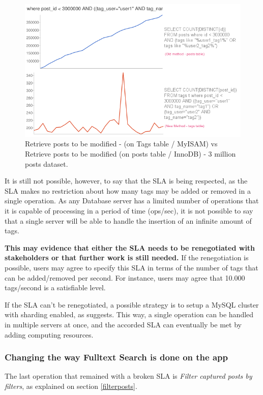 \begin{figure}[ht!]
\centering
\includegraphics[width=120mm]{Imagens/tagsVSposts.png}
\caption{Retrieve posts to be modified -  (on Tags table / MyISAM) vs Retrieve posts to be modified (on posts table / InnoDB) - 3 million posts dataset.\label{fig:tagsVSposts}}
\end{figure}

It is still not possible, however, to say that the SLA is being respected, as the SLA makes no restriction about how many tags may be added or removed in a single operation. As any Database server has a limited number of operations that it is capable of processing in a period of time (ops/sec), it is not possible to say that a single server will be able to handle the insertion of an infinite amount of tags. 

\textbf{This may evidence that either the SLA needs to be renegotiated with stakeholders or that further work is still needed.} If the renegotiation is possible, users may agree to specify this SLA in terms of the number of tags that can be added/removed per second. For instance, users may agree that 10.000 tags/second is a satisfiable level. 

If the SLA can't be renegotiated, a possible strategy is to setup a MySQL cluster with sharding enabled, as \cite{mysqlsharding} suggests. This way, a single operation can be handled in multiple servers at once, and the accorded SLA can eventually be met by adding computing resources.


\clearpage
\subsubsection{Changing the way Fulltext Search is done on the app}
\label{changing-fulltext-search}
The last operation that remained with a broken SLA is \textit{Filter captured posts by filters}, as explained on section \ref{filterposts}.

